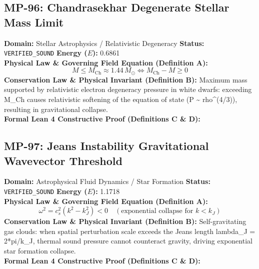\subsection{MP-96: Chandrasekhar Degenerate Stellar Mass Limit}
\textbf{Domain:} Stellar Astrophysics / Relativistic Degeneracy \hfill \textbf{Status:} \texttt{VERIFIED\_SOUND} \hfill \textbf{Energy ($E$):} 0.6861\\
\textbf{Physical Law \& Governing Field Equation (Definition A):}
\begin{equation*}
M \le M_{\text{Ch}} \approx 1.44 \, M_\odot \iff M_{\text{Ch}} - M \ge 0
\end{equation*}
\textbf{Conservation Law \& Physical Invariant (Definition B):}
Maximum mass supported by relativistic electron degeneracy pressure in white dwarfs: exceeding M\_Ch causes relativistic softening of the equation of state (P \textasciitilde{} rho\textasciicircum{}(4/3)), resulting in gravitational collapse.\\

\textbf{Formal Lean 4 Constructive Proof (Definitions C \& D):}


\vspace{1em}
\subsection{MP-97: Jeans Instability Gravitational Wavevector Threshold}
\textbf{Domain:} Astrophysical Fluid Dynamics / Star Formation \hfill \textbf{Status:} \texttt{VERIFIED\_SOUND} \hfill \textbf{Energy ($E$):} 1.1718\\
\textbf{Physical Law \& Governing Field Equation (Definition A):}
\begin{equation*}
\omega^2 = c_s^2 (k^2 - k_J^2) < 0 \quad (\text{exponential collapse for } k < k_J)
\end{equation*}
\textbf{Conservation Law \& Physical Invariant (Definition B):}
Self-gravitating gas clouds: when spatial perturbation scale exceeds the Jeans length lambda\_J = 2*pi/k\_J, thermal sound pressure cannot counteract gravity, driving exponential star formation collapse.\\

\textbf{Formal Lean 4 Constructive Proof (Definitions C \& D):}


\vspace{1em}
